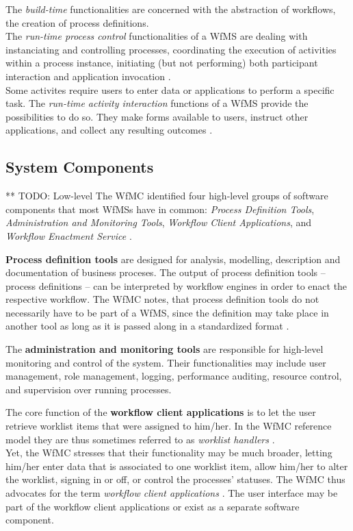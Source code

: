     The \emph{build-time} functionalities are concerned with the abstraction of workflows, \ie the creation of process definitions.\\
    The \emph{run-time process control} functionalities of a \ac{WfMS} are dealing with instanciating and controlling processes, coordinating the execution of activities within a process instance, initiating (but not performing) both participant interaction and application invocation \cite{Hollingsworth1995WfMC}.\\
    Some activites require users to enter data or applications to perform a specific task. The \emph{run-time activity interaction} functions of a \ac{WfMS} provide the possibilities to do so. They make forms available to users, instruct other applications, and collect any resulting outcomes \cite{Hollingsworth1995WfMC}.

  \subsection{System Components} %
  \label{sub:system_components}

    ** TODO: Low-level
    The \ac{WfMC} identified four high-level groups of software components that most \acp{WfMS} have in common: \emph{Process Definition Tools}, \emph{Administration and Monitoring Tools}, \emph{Workflow Client Applications}, and \emph{Workflow Enactment Service} \cite{Hollingsworth1995WfMC}.

    \textbf{Process definition tools} are designed for analysis, modelling, description and documentation of business proceses. The output of process definition tools -- process definitions -- can be interpreted by workflow engines in order to enact the respective workflow. The \ac{WfMC} notes, that process definition tools do not necessarily have to be part of a \ac{WfMS}, since the definition may take place in another tool as long as it is passed along in a standardized format \cite{Hollingsworth1995WfMC}.

    The \textbf{administration and monitoring tools} are responsible for high-level monitoring and control of the system. Their functionalities may include user management, role management, logging, performance auditing, resource control, and supervision over running processes.

    The core function of the \textbf{workflow client applications} is to let the user retrieve worklist items that were assigned to him/her. In the \ac{WfMC} reference model they are thus sometimes referred to as \emph{worklist handlers} \cite{Hollingsworth1995WfMC}. \\
    Yet, the \ac{WfMC} stresses that their functionality may be much broader, \eg letting him/her enter data that is associated to one worklist item, allow him/her to alter the worklist, signing in or off, or control the processes' statuses. The \ac{WfMC} thus advocates for the term \emph{workflow client applications} \cite{Hollingsworth1995WfMC}.
    The user interface may be part of the workflow client applications or exist as a separate software component.

